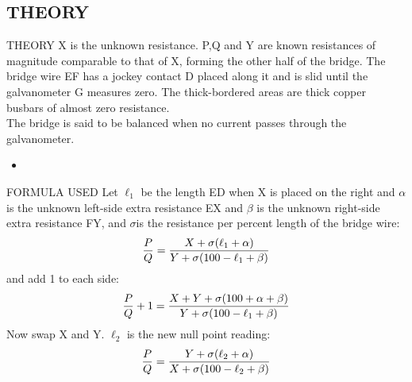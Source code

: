 \documentclass[aspectratio=169]{beamer}
\begin{document}
	\subsection{THEORY}
	\begin{frame}{THEORY}
		X is the unknown resistance. P,Q and Y are known resistances of magnitude comparable to that of X, forming the other half of the bridge. The bridge wire EF has a jockey contact D placed along it and is slid until the galvanometer G measures zero. The thick-bordered areas are thick copper busbars of almost zero resistance.\\ 
		The bridge is said to be balanced when no current passes through the galvanometer.\\ 
		\begin{itemize}
			\item
		\end{itemize}
	\end{frame}

	\begin{frame}{FORMULA USED}
		Let $\ell_{1}$ be the length ED when X is placed on the right and
		 $\alpha$ is the unknown left-side extra resistance EX and $\beta$ is the unknown right-side extra resistance FY, and $\sigma$is the resistance per percent length of the bridge wire: 
		\begin{equation*}
			{\displaystyle {P \over Q}={{X+\sigma (\ell _{1}+\alpha )} \over {Y+\sigma (100-\ell _{1}+\beta )}}}
		\end{equation*}
		and add 1 to each side:
		\begin{equation}
			{\displaystyle {P \over Q}+1={{X+Y+\sigma (100+\alpha +\beta )} \over {Y+\sigma (100-\ell _{1}+\beta )}}}
		\end{equation}
		Now swap X and Y. $\ell_{2}$ is the new null point reading: 
		\begin{equation*}
			{\displaystyle {P \over Q}={{Y+\sigma (\ell _{2}+\alpha )} \over {X+\sigma (100-\ell _{2}+\beta )}}}
		\end{equation*}
	\end{frame}
\end{document}
